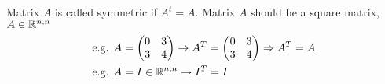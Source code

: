 \begin{definition}
Matrix $A$ is called symmetric if $A^t = A$. Matrix $A$ should be a square matrix, $A\in\mathbb{R}^{n,n}$
\begin{align*}
\text{e.g. }& A= \begin{pmatrix}
0 & 3 \\
3 & 4
\end{pmatrix} \to A^T = \begin{pmatrix}
0 & 3 \\
3 & 4
\end{pmatrix} \Rightarrow A^T = A\\
\text{e.g. }& A = I\in \mathbb{R}^{n,n} \to I^T = I
\end{align*}
\end{definition}
